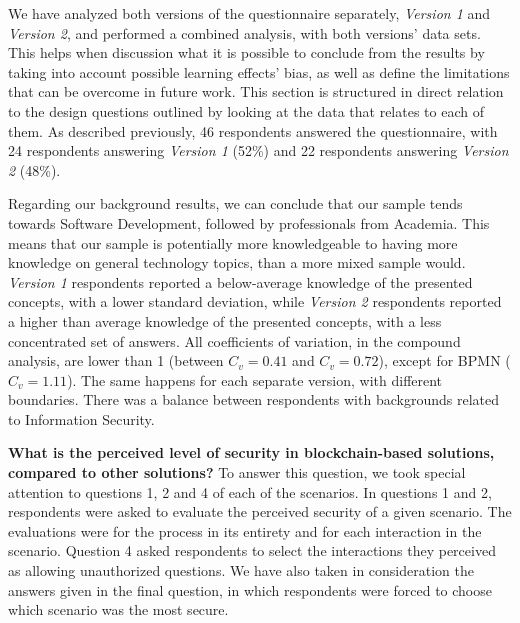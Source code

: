 We have analyzed both versions of the questionnaire separately, \textit{Version 1} and \textit{Version 2}, and performed a combined analysis, with both versions' data sets. This helps when discussion what it is possible to conclude from the results by taking into account possible learning effects' bias, as well as define the limitations that can be overcome in future work. This section is structured in direct relation to the design questions outlined by looking at the data that relates to each of them. As described previously, 46 respondents answered the questionnaire, with 24 respondents answering \textit{Version 1} (52\%) and 22 respondents answering \textit{Version 2} (48\%).

Regarding our background results, we can conclude that our sample tends towards Software Development, followed by professionals from Academia. This means that our sample is potentially more knowledgeable to having more knowledge on general technology topics, than a more mixed sample would. \textit{Version 1} respondents reported a below-average knowledge of the presented concepts, with a lower standard deviation, while \textit{Version 2} respondents reported a higher than average knowledge of the presented concepts, with a less concentrated set of answers. All coefficients of variation, in the compound analysis, are lower than 1 (between $C_v = 0.41$ and $C_v = 0.72$), except for BPMN ($C_v = 1.11$). The same happens for each separate version, with different boundaries. There was a balance between respondents with backgrounds related to Information Security.

\textbf{What is the perceived level of security in blockchain-based solutions, compared to other solutions?} To answer this question, we took special attention to questions 1, 2 and 4 of each of the scenarios. In questions 1 and 2, respondents were asked to evaluate the perceived security of a given scenario. The evaluations were for the process in its entirety and for each interaction in the scenario. Question 4 asked respondents to select the interactions they perceived as allowing unauthorized questions. We have also taken in consideration the answers given in the final question, in which respondents were forced to choose which scenario was the most secure.


